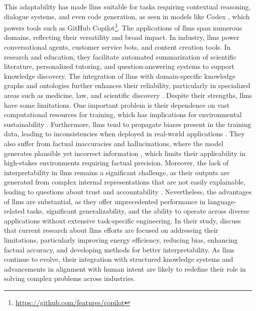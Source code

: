 This adaptability has made \glspl{llm} suitable for tasks requiring contextual reasoning, dialogue systems, and even code generation, as seen in models like Codex \cite{Chen2021EvaluatingLL}, which powers tools such as GitHub Copilot\footnote{\url{https://github.com/features/copilot}}.
The applications of \glspl{llm} span numerous domains, reflecting their versatility and broad impact.
In industry, \glspl{llm} power conversational agents, customer service bots, and content creation tools.
In research and education, they facilitate automated summarization of scientific literature, personalized tutoring, and question-answering systems to support knowledge discovery.
The integration of \glspl{llm} with domain-specific knowledge graphs and ontologies further enhances their reliability, particularly in specialized areas such as medicine, law, and scientific discovery \cite{Yang2024}.
Despite their strengths, \glspl{llm} have some limitations.
One important problem is their dependence on vast computational resources for training, which has implications for environmental sustainability \cite{Strubell2019EnergyAP}.
Furthermore, \glspl{llm} tend to propagate biases present in the training data, leading to inconsistencies when deployed in real-world applications \cite{Naveed2023}.
They also suffer from factual inaccuracies and hallucinations, where the model generates plausible yet incorrect information \cite{Chang2024}, which limits their applicability in high-stakes environments requiring factual precision.
Moreover, the lack of interpretability in \glspl{llm} remains a significant challenge, as their outputs are generated from complex internal representations that are not easily explainable, leading to questions about trust and accountability \cite{Naveed2023}.
Nevertheless, the advantages of \glspl{llm} are substantial, as they offer unprecedented performance in language-related tasks, significant generalizability, and the ability to operate across diverse applications without extensive task-specific engineering.
In their study, \textcite{Naveed2023} discuss that current research about \glspl{llm} efforts are focused on addressing their limitations, particularly improving energy efficiency, reducing bias, enhancing factual accuracy, and developing methods for better interpretability.
As \glspl{llm} continue to evolve, their integration with structured knowledge systems and advancements in alignment with human intent are likely to redefine their role in solving complex problems across industries.